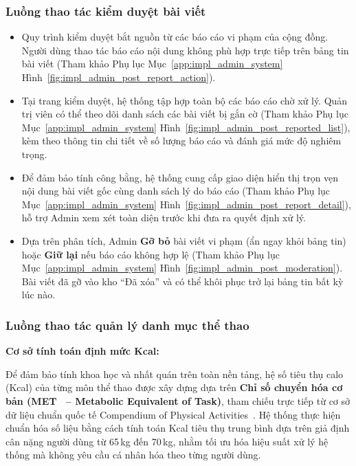 \subsubsection{Luồng thao tác kiểm duyệt bài viết}
\begin{itemize}
    \item Quy trình kiểm duyệt bắt nguồn từ các báo cáo vi phạm của cộng đồng. Người dùng thao tác báo cáo nội dung không phù hợp trực tiếp trên bảng tin bài viết (Tham khảo Phụ lục Mục~\ref{app:impl_admin_system} Hình~\ref{fig:impl_admin_post_report_action}).


    \item Tại trang kiểm duyệt, hệ thống tập hợp toàn bộ các báo cáo chờ xử lý. Quản trị viên có thể theo dõi danh sách các bài viết bị gắn cờ (Tham khảo Phụ lục Mục~\ref{app:impl_admin_system} Hình~\ref{fig:impl_admin_post_reported_list}), kèm theo thông tin chi tiết về số lượng báo cáo và đánh giá mức độ nghiêm trọng.


    \item Để đảm bảo tính công bằng, hệ thống cung cấp giao diện hiển thị trọn vẹn nội dung bài viết gốc cùng danh sách lý do báo cáo (Tham khảo Phụ lục Mục~\ref{app:impl_admin_system} Hình~\ref{fig:impl_admin_post_report_detail}), hỗ trợ Admin xem xét toàn diện trước khi đưa ra quyết định xử lý.


    \item Dựa trên phân tích, Admin \textbf{Gỡ bỏ} bài viết vi phạm (ẩn ngay khỏi bảng tin) hoặc \textbf{Giữ lại} nếu báo cáo không hợp lệ (Tham khảo Phụ lục Mục~\ref{app:impl_admin_system} Hình~\ref{fig:impl_admin_post_moderation}). Bài viết đã gỡ vào kho ``Đã xóa'' và có thể khôi phục trở lại bảng tin bất kỳ lúc nào.

\end{itemize}

\subsubsection{Luồng thao tác quản lý danh mục thể thao}

\textbf{Cơ sở tính toán định mức Kcal:}

Để đảm bảo tính khoa học và nhất quán trên toàn nền tảng, hệ số tiêu thụ calo (Kcal) của từng môn thể thao được xây dựng dựa trên \textbf{Chỉ số chuyển hóa cơ bản (MET~\cite{Healthline_TDEE} -- Metabolic Equivalent of Task)}, tham chiếu trực tiếp từ cơ sở dữ liệu chuẩn quốc tế Compendium of Physical Activities~\cite{CompendiumPhysicalActivities}. Hệ thống thực hiện chuẩn hóa số liệu bằng cách tính toán Kcal tiêu thụ trung bình dựa trên giả định cân nặng người dùng từ 65\,kg đến 70\,kg, nhằm tối ưu hóa hiệu suất xử lý hệ thống mà không yêu cầu cá nhân hóa theo từng người dùng.

